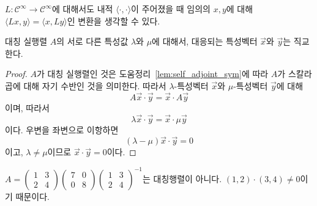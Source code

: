 \documentclass[sections/engineering_mathematics_lecture_note.tex]{subfiles}
\begin{document}
\begin{remark}
    $L: \mathcal C^\infty \rightarrow \mathcal C^\infty$에 대해서도 내적 $\langle \cdot, \cdot \rangle$이 주어졌을 때 임의의 $x, y$에 대해 $\langle L x, y \rangle = \langle x, Ly \rangle$인 변환을 생각할 수 있다.
\end{remark}

\begin{theorem} \label{thm:sym_eigenvector_orthogonal}
    대칭 실행렬 $A$의 서로 다른 특성값 $\lambda$와 $\mu$에 대해서, 대응되는 특성벡터 $\vec x$와 $\vec y$는 직교한다.
\end{theorem}

\begin{proof}
    $A$가 대칭 실행렬인 것은 도움정리~\ref{lem:self_adjoint_sym}에 따라 $A$가 스칼라곱에 대해 자기 수반인 것을 의미한다.
    따라서 $\lambda$-특성벡터 $\vec x$와 $\mu$-특성벡터 $\vec y$에 대해
    \begin{equation*}
        A \vec x \cdot \vec y = \vec x \cdot A \vec y
    \end{equation*}
    이며, 따라서
    \begin{equation*}
        \lambda \vec x \cdot \vec y = \vec x \cdot \mu \vec y
    \end{equation*}
    이다.
    우변을 좌변으로 이항하면
    \begin{equation*}
        (\lambda - \mu) \vec x \cdot \vec y = 0
    \end{equation*}
    이고, $\lambda \neq \mu$이므로 $\vec x \cdot \vec y = 0$이다.
\end{proof}

\begin{example}
    $A = \begin{pmatrix}1 & 3\\2 & 4\end{pmatrix} \begin{pmatrix}7 & 0\\ 0 & 8\end{pmatrix}\begin{pmatrix}1 & 3\\2 & 4\end{pmatrix}^{-1}$는 대칭행렬이 아니다.
    $(1, 2) \cdot (3, 4) \neq 0$이기 때문이다.
\end{example}
\end{document}
